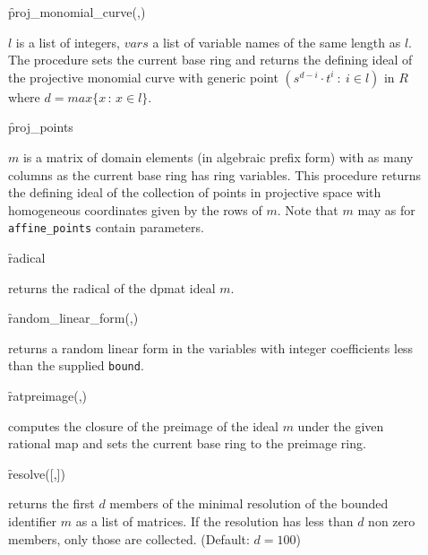 \begin{description}
\item[]
  \begin{syntax}
    \f{proj\_monomial\_curve}(,)
  \end{syntax}
  \hypertarget{operator:PROJ_MONOMIAL_CURVE}{}
$l$ is a list of integers, $vars$ a list of variable names of the
same length as $l$. The procedure sets the current base ring and
returns the defining ideal of the projective monomial curve with
generic point \mbox{$(s^{d-i}\cdot t^i\ :\ i\in l)$} in $R$ where $d=max\{
x\, :\, x\in l\}$.

\item[]
  \begin{syntax}
    \f{proj\_points} 
  \end{syntax}
  \hypertarget{operator:PROJ_POINTS}{}
$m$ is a matrix of domain elements (in algebraic prefix form)
with as many columns as the current base ring has ring variables. This
procedure returns the defining ideal of the collection of points in
projective space with homogeneous coordinates given by the rows of
$m$. Note that $m$ may as for \texttt{affine\_points} contain
parameters.

\item[]
  \begin{syntax}
    \f{radical} 
  \end{syntax}
  \hypertarget{operator:RADICAL}{}
returns the radical of the dpmat ideal $m$.

\item[]
  \begin{syntax}
    \f{random\_linear\_form}(,)
  \end{syntax}
  \hypertarget{operator:RANDOM_LINEAR_FORM}{}
returns a random linear form in the variables  with integer
coefficients less than the supplied \texttt{bound}.

\item[]
  \begin{syntax}
    \f{ratpreimage}(,)
  \end{syntax}
  \hypertarget{operator:RATPREIMAGE}{}
computes the closure of the preimage of the ideal $m$ under the
given rational map and sets the current base ring to the preimage
ring.

\item[]
  \begin{syntax}
    \f{resolve}([,])
  \end{syntax}
  \hypertarget{operator:RESOLVE}{}
returns the first $d$ members of the minimal resolution of the
bounded identifier $m$ as a list of matrices. If the resolution has
less than $d$ non zero members, only those are collected. (Default:
$d=100$)


\end{description}
